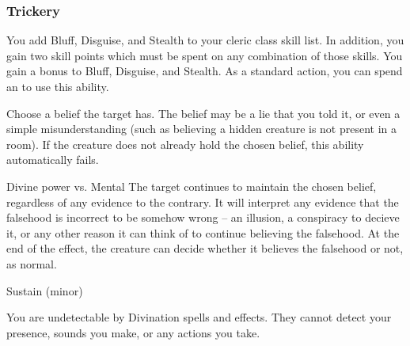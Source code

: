         \subsubsection{Trickery}
             You add Bluff, Disguise, and Stealth to your cleric class skill list.
            In addition, you gain two skill points which must be spent on any combination of those skills.
             You gain a  bonus to Bluff, Disguise, and Stealth.
             As a standard action, you can spend an  to use this ability.
            \begin{ability}
                \begin{spelltargetinginfo}
                    \spellspecial Choose a belief the target has.
                    The belief may be a lie that you told it, or even a simple misunderstanding (such as believing a hidden creature is not present in a room).
                    If the creature does not already hold the chosen belief, this ability automatically fails.
                \end{spelltargetinginfo}
                \begin{spelleffects}
                    \begin{spellattack}{Divine power vs. Mental}
                        \spellsuccess The target continues to maintain the chosen belief, regardless of any evidence to the contrary.
                        It will interpret any evidence that the falsehood is incorrect to be somehow wrong -- an illusion, a conspiracy to decieve it, or any other reason it can think of to continue believing the falsehood.
                        At the end of the effect, the creature can decide whether it believes the falsehood or not, as normal.
                    \end{spellattack}
                    \spelldur Sustain (minor)
                \end{spelleffects}
            \end{ability}
             You are undetectable by Divination spells and effects.
            They cannot detect your presence, sounds you make, or any actions you take.

